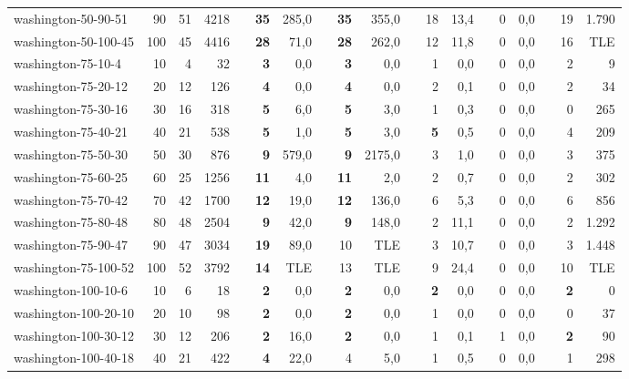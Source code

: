 \begin{table}[!ht]
{\begin{tabular}{lrrrlrrlrrlrrlrrlrr}
washington-50-90-51 & 90 & 51 & 4218 &  & \textbf{35} & 285,0 &  & \textbf{35} & 355,0 &  & 18 & 13,4 &  & 0 & 0,0 &  & 19 & 1.790 \\
washington-50-100-45 & 100 & 45 & 4416 &  & \textbf{28} & 71,0 &  & \textbf{28} & 262,0 &  & 12 & 11,8 &  & 0 & 0,0 &  & 16 & TLE \\ \hline
washington-75-10-4 & 10 & 4 & 32 &  & \textbf{3} & 0,0 &  & \textbf{3} & 0,0 &  & 1 & 0,0 &  & 0 & 0,0 &  & 2 & 9 \\
washington-75-20-12 & 20 & 12 & 126 &  & \textbf{4} & 0,0 &  & \textbf{4} & 0,0 &  & 2 & 0,1 &  & 0 & 0,0 &  & 2 & 34 \\
washington-75-30-16 & 30 & 16 & 318 &  & \textbf{5} & 6,0 &  & \textbf{5} & 3,0 &  & 1 & 0,3 &  & 0 & 0,0 &  & 0 & 265 \\
washington-75-40-21 & 40 & 21 & 538 &  & \textbf{5} & 1,0 &  & \textbf{5} & 3,0 &  & \textbf{5} & 0,5 &  & 0 & 0,0 &  & 4 & 209 \\
washington-75-50-30 & 50 & 30 & 876 &  & \textbf{9} & 579,0 &  & \textbf{9} & 2175,0 &  & 3 & 1,0 &  & 0 & 0,0 &  & 3 & 375 \\
washington-75-60-25 & 60 & 25 & 1256 &  & \textbf{11} & 4,0 &  & \textbf{11} & 2,0 &  & 2 & 0,7 &  & 0 & 0,0 &  & 2 & 302 \\
washington-75-70-42 & 70 & 42 & 1700 &  & \textbf{12} & 19,0 &  & \textbf{12} & 136,0 &  & 6 & 5,3 &  & 0 & 0,0 &  & 6 & 856 \\
washington-75-80-48 & 80 & 48 & 2504 &  & \textbf{9} & 42,0 &  & \textbf{9} & 148,0 &  & 2 & 11,1 &  & 0 & 0,0 &  & 2 & 1.292 \\
washington-75-90-47 & 90 & 47 & 3034 &  & \textbf{19} & 89,0 &  & 10 & TLE &  & 3 & 10,7 &  & 0 & 0,0 &  & 3 & 1.448 \\
washington-75-100-52 & 100 & 52 & 3792 &  & \textbf{14} & TLE &  & 13 & TLE &  & 9 & 24,4 &  & 0 & 0,0 &  & 10 & TLE \\ \hline
washington-100-10-6 & 10 & 6 & 18 &  & \textbf{2} & 0,0 &  & \textbf{2} & 0,0 &  & \textbf{2} & 0,0 &  & 0 & 0,0 &  & \textbf{2} & 0 \\
washington-100-20-10 & 20 & 10 & 98 &  & \textbf{2} & 0,0 &  & \textbf{2} & 0,0 &  & 1 & 0,0 &  & 0 & 0,0 &  & 0 & 37 \\
washington-100-30-12 & 30 & 12 & 206 &  & \textbf{2} & 16,0 &  & \textbf{2} & 0,0 &  & 1 & 0,1 &  & 1 & 0,0 &  & \textbf{2} & 90 \\
washington-100-40-18 & 40 & 21 & 422 &  & \textbf{4} & 22,0 & \textbf{} & 4 & 5,0 &  & 1 & 0,5 &  & 0 & 0,0 &  & 1 & 298 \\

\end{tabular}}
\end{table}
